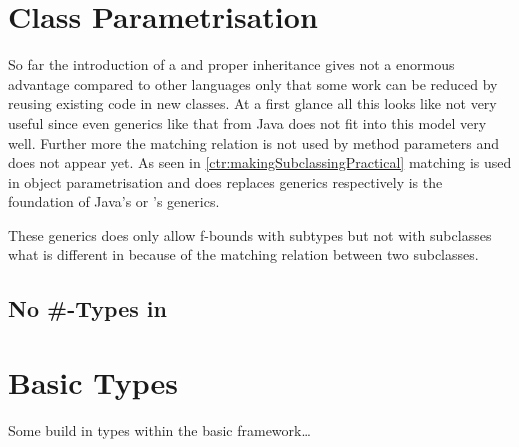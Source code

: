 \section{Class Parametrisation}
So far the introduction of a \mytype and proper inheritance gives not a
enormous advantage compared to other languages only that some work can
be reduced by reusing existing code in new classes. At a first glance
all this looks like not very useful since even generics like that from
Java does not fit into this model very well. Further more the matching
relation is not used by method parameters and does not appear yet. As
seen in \cref{ctr:makingSubclassingPractical} matching is used in object
parametrisation and does replaces generics respectively is the foundation
of Java's or \cs's generics.

These generics does only allow f-bounds with subtypes but not with
subclasses what is different in \ooplss because of the matching relation
between two subclasses.

\subsection{No \#-Types in \ooplss}
\cite{bruce_foundations_2002}

\section{Basic Types}
Some build in types within the basic framework\ldots

